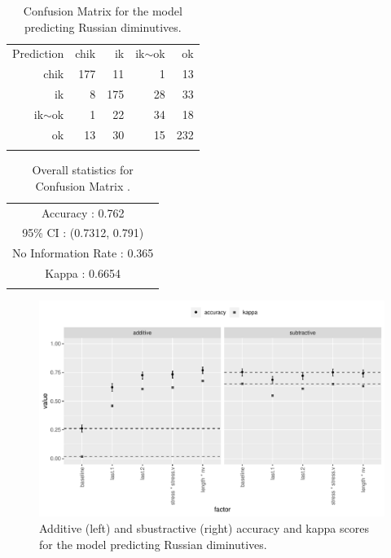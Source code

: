 \begin{table}
  \centering
  \begin{tabular}{rrrrr}
    \lsptoprule
    \multicolumn{5}{c}{Reference}               \\
    \midrule
    Prediction  & chik & ik  & ik$\sim$ok & ok  \\
     chik       & 177  & 11  & 1          & 13  \\
     ik         & 8    & 175 & 28         & 33  \\
     ik$\sim$ok & 1    & 22  & 34         & 18  \\
     ok         & 13   & 30  & 15         & 232 \\
    \lspbottomrule
  \end{tabular}
  \caption{Confusion Matrix for the model predicting Russian diminutives.}\label{tab:dim-russ}
\end{table}

\begin{table}
  \centering
  \begin{tabular}{llrrr}
    \lsptoprule
    \multicolumn{5}{c}{Overall statistics:} \\

    \midrule
    \multicolumn{5}{c}{Accuracy : 0.762}\\
    \multicolumn{5}{c}{95\% CI : (0.7312, 0.791)}\\
    \multicolumn{5}{c}{No Information Rate : 0.365}\\
    \multicolumn{5}{c}{Kappa : 0.6654}\\
    \lspbottomrule
  \end{tabular}
  \caption{Overall statistics for Confusion Matrix .}\label{tab:dim-russ-stats}
\end{table}

\begin{figure}
  \centering
  \includegraphics[width=1.0\textwidth]{./figures/russian/factimp-plot.pdf}
    \caption{Additive (left) and sbustractive (right) accuracy and kappa scores for the model predicting Russian diminutives.}\label{fig:factimp-plot-russian}
\end{figure}

